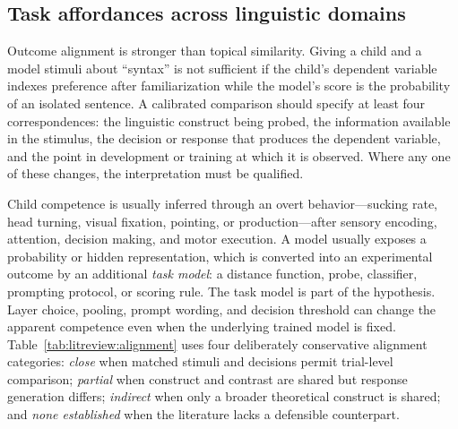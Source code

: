 \subsection{Task affordances across linguistic domains}
\label{sec:litreview:task-affordances}

Outcome alignment is stronger than topical similarity. Giving a child and a model stimuli about ``syntax'' is not sufficient if the child's dependent variable indexes preference after familiarization while the model's score is the probability of an isolated sentence. A calibrated comparison should specify at least four correspondences: the linguistic construct being probed, the information available in the stimulus, the decision or response that produces the dependent variable, and the point in development or training at which it is observed. Where any one of these changes, the interpretation must be qualified.

Child competence is usually inferred through an overt behavior---sucking rate, head turning, visual fixation, pointing, or production---after sensory encoding, attention, decision making, and motor execution. A model usually exposes a probability or hidden representation, which is converted into an experimental outcome by an additional \emph{task model}: a distance function, probe, classifier, prompting protocol, or scoring rule. The task model is part of the hypothesis. Layer choice, pooling, prompt wording, and decision threshold can change the apparent competence even when the underlying trained model is fixed. Table~\ref{tab:litreview:alignment} uses four deliberately conservative alignment categories: \emph{close} when matched stimuli and decisions permit trial-level comparison; \emph{partial} when construct and contrast are shared but response generation differs; \emph{indirect} when only a broader theoretical construct is shared; and \emph{none established} when the literature lacks a defensible counterpart.

